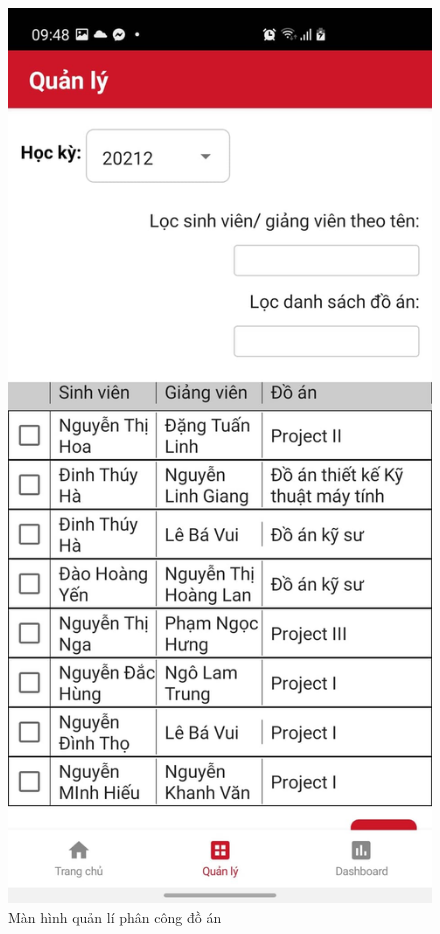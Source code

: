 \documentclass[../Main.tex]{subfiles}
\begin{document}
\begin{figure}[H]
\begin{minipage}{0.5\textwidth}
\includegraphics[width=0.66\linewidth]{Figure/screen/management_project.jpeg}
\caption{Màn hình quản lí phân công đồ án} \label{fig:list_task}
\end{minipage}
\end{figure}
\noindent %
\end{document}
